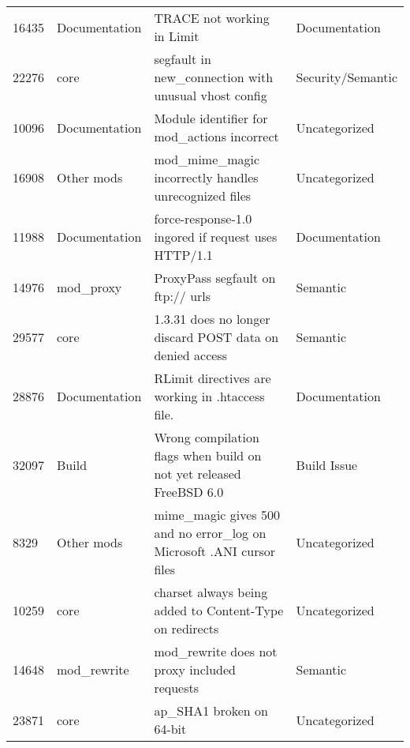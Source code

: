 \begin{longtable}[c]{llll}
16435  & Documentation      & TRACE not working in Limit                                                                & Documentation     \\
22276  & core               & segfault in new\_connection with unusual vhost config                                                          & Security/Semantic \\
10096  & Documentation      & Module identifier for mod\_actions incorrect                                                                   & Uncategorized     \\
16908  & Other mods         & mod\_mime\_magic incorrectly handles unrecognized files                                                        & Uncategorized     \\
11988  & Documentation      & force-response-1.0 ingored if request uses HTTP/1.1                                                            & Documentation     \\
14976  & mod\_proxy         & ProxyPass segfault on ftp:// urls                                                                              & Semantic          \\
29577  & core               & 1.3.31 does no longer discard POST data on denied access                                                       & Semantic          \\
28876  & Documentation      & RLimit directives are working in .htaccess file.                                                               & Documentation     \\
32097  & Build              & Wrong compilation flags when build on not yet released FreeBSD 6.0                                             & Build Issue       \\
8329   & Other mods         & mime\_magic gives 500 and no error\_log on Microsoft .ANI cursor files                                         & Uncategorized     \\
10259  & core               & charset always being added to Content-Type on redirects                                                        & Uncategorized     \\
14648  & mod\_rewrite       & mod\_rewrite does not proxy included requests                                                                  & Semantic          \\
23871  & core               & ap\_SHA1 broken on 64-bit                                                                                      & Uncategorized     \\

\end{longtable}
